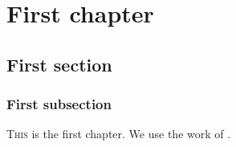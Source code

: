 \clearpage{}

\pagestyle{body}

\chapter{First chapter}
\label{chap:first}




\section{First section}
\label{sec:chap-first-first}

\subsection{First subsection}
\label{subsec:chap-first-first}

\lettrine{T}{his} is the first chapter.
We use the work of \textcite{villani2009}.
